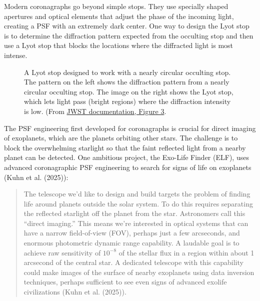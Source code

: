 \documentclass[
  letterpaper,
]{book}
\begin{document}
Modern coronagraphs go beyond simple stops. They use specially shaped
apertures and optical elements that adjust the phase of the incoming
light, creating a PSF with an extremely dark center. One way to design
the Lyot stop is to determine the diffraction pattern expected from the
occulting stop and then use a Lyot stop that blocks the locations where
the diffracted light is most intense.

\begin{figure}


\caption{\label{fig-optics-lyot-stops}A Lyot stop designed to work with
a nearly circular occulting stop. The pattern on the left shows the
diffraction pattern from a nearly circular occulting stop. The image on
the right shows the Lyot stop, which lets light pass (bright regions)
where the diffraction intensity is low. (From
\href{https://tinyurl.com/bp8vmkz8}{JWST documentation, Figure 3}.}

\end{figure}%

The PSF engineering first developed for coronagraphs is crucial for
direct imaging of exoplanets, which are the planets orbiting other
stars. The challenge is to block the overwhelming starlight so that the
faint reflected light from a nearby planet can be detected. One
ambitious project, the Exo-Life Finder (ELF), uses advanced
coronagraphic PSF engineering to search for signs of life on exoplanets
(Kuhn et al. (2025)):

\begin{quote}
The telescope we'd like to design and build targets the problem of
finding life around planets outside the solar system. To do this
requires separating the reflected starlight off the planet from the
star. Astronomers call this ``direct imaging.'' This means we're
interested in optical systems that can have a narrow field-of-view
(FOV), perhaps just a few arcseconds, and enormous photometric dynamic
range capability. A laudable goal is to achieve raw sensitivity of
\(10^{-8}\) of the stellar flux in a region within about 1 arcsecond of
the central star. A dedicated telescope with this capability could make
images of the surface of nearby exoplanets using data inversion
techniques, perhaps sufficient to see even signs of advanced exolife
civilizations (Kuhn et al. (2025)).
\end{quote}
\end{document}
